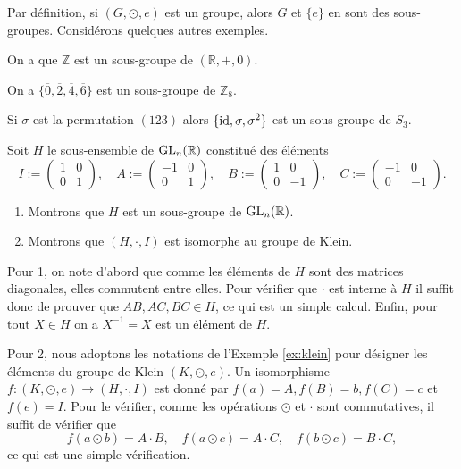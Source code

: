 \documentclass[french,course,oneside,theoremnosection]{lecture}
\newcommand{\R}{\mathbb{R}}
\newcommand{\Z}{\mathbb{Z}}
\begin{document}
Par définition, si $(G, \odot, e)$ est un groupe, alors $G$ et $\{e\}$ en sont des sous-groupes. Considérons quelques autres exemples.
\begin{example}
On a que $\Z$ est un sous-groupe de $(\R, +, 0)$.
\end{example}
\begin{example}
On a $\{\overline{0},\overline{2},\overline{4},\overline{6}\}$ est un sous-groupe de $\Z_8$.
\end{example}
\begin{example}
Si $\sigma$ est la permutation $(123)$ alors $\{\operatorname{id}, \sigma, \sigma^2\}$ est un sous-groupe de $S_3$.
\end{example}
\begin{example}
Soit $H$ le sous-ensemble de $\GL_n(\R)$ constitué des éléments
\[
I:=\begin{pmatrix}
1 & 0\\
0 & 1
\end{pmatrix},\quad
A:=\begin{pmatrix}
-1 & 0\\
0 & 1
\end{pmatrix}, \quad
B:=\begin{pmatrix}
1 & 0\\
0 & -1
\end{pmatrix},\quad
C:=\begin{pmatrix}
-1 & 0\\
0 & -1
\end{pmatrix}.
\]
\begin{enumerate}
\item Montrons que $H$ est un sous-groupe de $\GL_n(\R)$.
\item Montrons que $(H, \cdot, I)$ est isomorphe au groupe de Klein.
\end{enumerate}

Pour 1, on note d'abord que comme les éléments de $H$ sont des matrices diagonales, elles commutent entre elles. Pour vérifier que $\cdot$ est interne à $H$ il suffit donc de prouver que $AB, AC, BC \in H$, ce qui est un simple calcul. Enfin, pour tout $X\in H$ on a $X^{-1}=X$ est un élément de $H$.

Pour 2, nous adoptons les notations de l'Exemple \ref{ex:klein} pour désigner les éléments du groupe de Klein $(K, \odot, e)$. Un isomorphisme $f\colon(K,\odot, e) \to (H, \cdot, I)$ est donné par $f(a)=A, f(B)=b, f(C)=c$ et $f(e)=I$. Pour le vérifier, comme les opérations $\odot$ et $\cdot$ sont commutatives, il suffit de vérifier que
\[
f(a\odot b)= A\cdot B, \quad f(a\odot c)=A \cdot C, \quad f(b \odot c)=B \cdot C,
\]
ce qui est une simple vérification.
\end{example}
\end{document}
